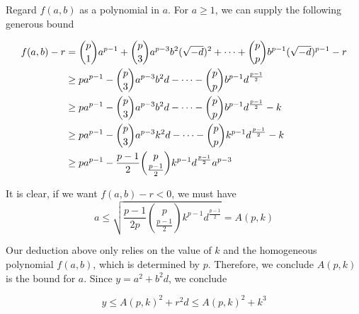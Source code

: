 Regard $f(a, b)$ as a polynomial in $a$. 
For $a \geq 1$, we can supply the following generous bound

\begin{align*}
	f(a, b) - r&= \binom{p}{1} a^{p-1} + \binom{p}{3} a^{p-3} b^2 (\sqrt{-d})^2 + \cdots + \binom{p}{p} b^{p-1} (\sqrt{-d})^{p-1} - r\\
			&\geq p a^{p-1} - \binom{p}{3} a^{p-3} b^2 d - \cdots - \binom{p}{p} b^{p-1} d^{\frac{p-1}{2}} \\
			&\geq p a^{p-1} - \binom{p}{3} a^{p-3} b^2 d - \cdots - \binom{p}{p} b^{p-1} d^{\frac{p-1}{2}} - k\\
			&\geq p a^{p-1} - \binom{p}{3} a^{p-3} k^2 d - \cdots - \binom{p}{p} k^{p-1} d^{\frac{p-1}{2}} - k\\
			&\geq p a^{p-1} - \frac{p-1}{2} \binom{p}{\frac{p-1}{2}}k^{p-1} d^{\frac{p-1}{2}}  a^{p-3} 
\end{align*}

It is clear, if we want $f(a, b) - r < 0$, we must have
$$
a \leq \sqrt{\frac{p-1}{2p} \binom{p}{\frac{p-1}{2}}k^{p-1} d^{\frac{p-1}{2}}}= A(p, k)
$$

Our deduction above only relies on the value of $k$ and the homogeneous polynomial $f(a, b)$, which is determined by $p$. 
Therefore, we conclude $A(p, k)$ is the bound for $a$.
Since $y = a^2 + b^2d$, we conclude 

$$
y \leq A(p, k)^2 + r^2 d \leq A(p, k)^2 +k^3 
$$

